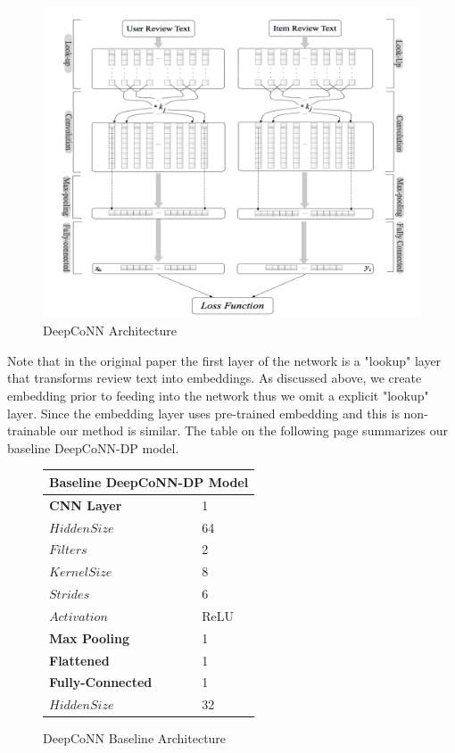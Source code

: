 \documentclass[10pt, twocolumn, letterpaper]{article}
\begin{document}
\begin{figure}[!ht]
\begin{center}
\includegraphics[scale=0.40]{DeepCoNN}
\caption{DeepCoNN Architecture}
\end{center}
\end{figure}

Note that in the original paper the first layer of the network is a "lookup" layer that transforms review text into embeddings. As discussed above, we create embedding prior to feeding into the network thus we omit a explicit "lookup" layer. Since the embedding layer uses pre-trained embedding and this is non-trainable our method is similar. The table on the following page summarizes our baseline DeepCoNN-DP model.


\begin{figure}[!ht]
\begin{center}
{
\begin{tabular}{ |p{3cm}|p{1cm}| }
 \hline
 \multicolumn{2}{|c|}{\textbf{Baseline DeepCoNN-DP Model}} \\
 \hline
 \textbf{CNN Layer} & 1  \\
 $Hidden Size$ & 64 \\
 $Filters$   & 2    \\
 $Kernel Size$ &   8\\
 $Strides$ & 6 \\
 $Activation$    & ReLU \\
 \hline
 \textbf{Max Pooling} &   1  \\
   \hline
 \textbf{Flattened} & 1    \\
  \hline
 \textbf{Fully-Connected} & 1  \\
  $Hidden Size$ & 32 \\

 \hline
\end{tabular}
}
\end{center}
\caption{DeepCoNN Baseline Architecture}
\end{figure}
\end{document}
